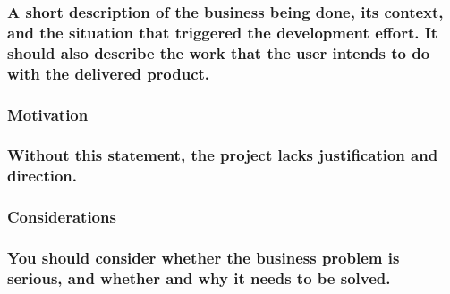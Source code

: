\documentclass[
]{article}
\begin{document}
\hypertarget{a-short-description-of-the-business-being-done-its-context-and-the-situation-that-triggered-the-development-effort.-it-should-also-describe-the-work-that-the-user-intends-to-do-with-the-delivered-product.}{%
\subsubsection{\texorpdfstring{A short description of the business being
done, its context, and the situation that triggered the development
effort. It should also describe the work that the user intends to do
with the delivered product.
}{A short description of the business being done, its context, and the situation that triggered the development effort. It should also describe the work that the user intends to do with the delivered product. }}\label{a-short-description-of-the-business-being-done-its-context-and-the-situation-that-triggered-the-development-effort.-it-should-also-describe-the-work-that-the-user-intends-to-do-with-the-delivered-product.}}

\hypertarget{motivation}{%
\subsubsection{Motivation}\label{motivation}}

\hypertarget{without-this-statement-the-project-lacks-justification-and-direction.}{%
\subsubsection{Without this statement, the project lacks justification
and
direction.}\label{without-this-statement-the-project-lacks-justification-and-direction.}}

\hypertarget{considerations}{%
\subsubsection{Considerations}\label{considerations}}

\hypertarget{you-should-consider-whether-the-business-problem-is-serious-and-whether-and-why-it-needs-to-be-solved.}{%
\subsubsection{You should consider whether the business problem is
serious, and whether and why it needs to be
solved.}\label{you-should-consider-whether-the-business-problem-is-serious-and-whether-and-why-it-needs-to-be-solved.}}
\end{document}
